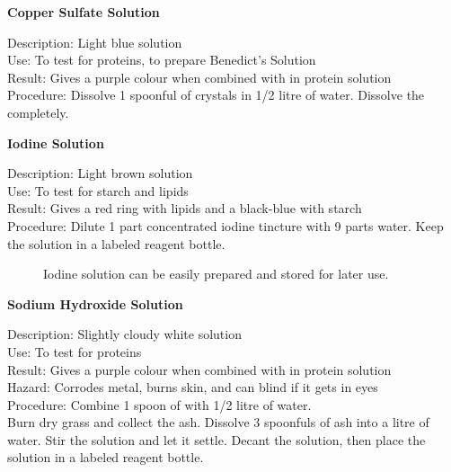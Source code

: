 \begin{flushleft}
\textbf{Copper Sulfate Solution}
\end{flushleft}
\vspace{-10pt}
Description: Light blue solution\\
Use: To test for proteins, to prepare Benedict's Solution\\
Result: Gives a purple colour when combined with  in protein solution\\
Procedure: Dissolve 1 spoonful of  crystals in 1/2 litre of water. Dissolve the  completely.\\

\begin{flushleft}
\textbf{Iodine Solution}
\end{flushleft}
\vspace{-10pt}
Description: Light brown solution\\
Use: To test for starch and lipids\\
Result: Gives a red ring with lipids and a black-blue with starch\\
Procedure: Dilute 1 part concentrated iodine tincture with 9 parts water. Keep the solution in a labeled reagent bottle.\\

\begin{figure}[h]
\begin{center}
\def\svgwidth{2cm}

\caption{Iodine solution can be easily prepared and stored for later use.}
\label{fig:iodine}
\end{center}
\end{figure}

\begin{flushleft}
\textbf{Sodium Hydroxide Solution}
\end{flushleft}
\vspace{-10pt}
Description: Slightly cloudy white solution\\
Use: To test for proteins\\
Result: Gives a purple colour when combined with  in protein solution\\
Hazard: Corrodes metal, burns skin, and can blind if it gets in eyes\\
Procedure: Combine 1 spoon of  with 1/2 litre of water.\\
Burn dry grass and collect the ash. Dissolve 3 spoonfuls of ash into a litre of water. Stir the solution and let it settle. Decant the solution, then place the solution in a labeled reagent bottle.
